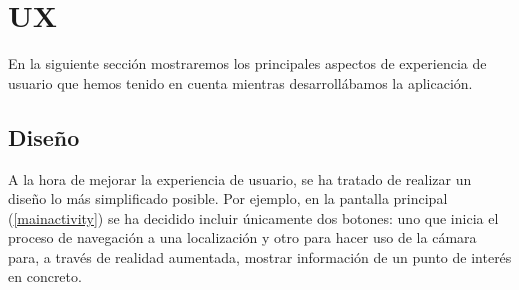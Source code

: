 \documentclass[12pt, a4paper, titlepage]{article}
\begin{document}
	\clearpage
	
	\section{UX}
	
	En la siguiente sección mostraremos los principales aspectos de experiencia de usuario que hemos tenido en cuenta mientras desarrollábamos la aplicación. 
	
	\subsection{Diseño}
	
	A la hora de mejorar la experiencia de usuario, se ha tratado de realizar un diseño lo más simplificado posible. Por ejemplo, en la pantalla principal (\autoref{mainactivity}) se ha decidido incluir únicamente dos botones: uno que inicia el proceso de navegación a una localización y otro para hacer uso de la cámara para, a través de realidad aumentada, mostrar información de un punto de interés en concreto.
	
\end{document}
